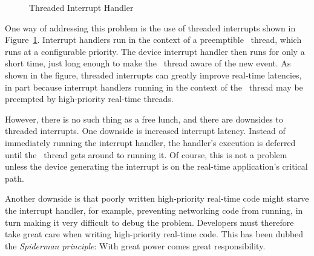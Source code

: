 \begin{figure}[tb]
\centering
{}
\caption{Threaded Interrupt Handler}
\label{fig:advsync:Threaded Interrupt Handler}
\end{figure}

One way of addressing this problem is the use of threaded interrupts shown in
Figure~\ref{fig:advsync:Threaded Interrupt Handler}.
Interrupt handlers run in the context of a preemptible \IRQ\ thread,
which runs at a configurable priority.
The device interrupt handler then runs for only a short time, just
long enough to make the \IRQ\ thread aware of the new event.
As shown in the figure, threaded interrupts can greatly improve
real-time latencies, in part because interrupt handlers running in
the context of the \IRQ\ thread may be preempted by high-priority real-time
threads.

However, there is no such thing as a free lunch, and there are downsides
to threaded interrupts.
One downside is increased interrupt latency.
Instead of immediately running the interrupt handler, the handler's execution
is deferred until the \IRQ\ thread gets around to running it.
Of course, this is not a problem unless the device generating the interrupt
is on the real-time application's critical path.

Another downside is that poorly written high-priority real-time code
might starve the interrupt handler, for example, preventing networking
code from running, in turn making it very difficult to debug the problem.
Developers must therefore take great care when writing high-priority
real-time code.
This has been dubbed the \emph{Spiderman principle}: With great power
comes great responsibility.

